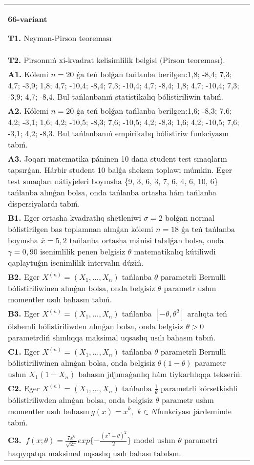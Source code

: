 \documentclass{article}
\begin{document}
\vspace{1cm}


\begin{tabular}{m{17cm}}
\textbf{66-variant}
\newline

\textbf{T1.} 
Neyman-Pirson teoreması
 \\
\textbf{T2.} 
Pirsonnıń xi-kvadrat kelisimlilik belgisi (Pirson teoreması).
 \\
\textbf{A1.} 
Kólemi \(n = 20\) ǵa teń bolǵan tańlanba berilgen:1,8; -8,4; 7,3; 4,7; -3,9; 1,8; 4,7; -10,4; -8,4; 7,3; -10,4; 4,7; -8,4; 1,8; 4,7; -10,4; 7,3; -3,9; 4,7; -8,4. Bul tańlanbanıń statistikalıq bólistiriliwin tabıń.
 \\
\textbf{A2.} 
Kólemi \(n = 20\) ǵa teń bolǵan tańlanba berilgen:1,6; -8,3; 7,6; 4,2; -3,1; 1,6; 4,2; -10,5; -8,3; 7,6; -10,5; 4,2; -8,3; 1,6; 4,2; -10,5; 7,6; -3,1; 4,2; -8,3. Bul tańlanbanıń empirikalıq bólistiriw funkciyasın tabıń.
 \\
\textbf{A3.} 
Joqarı matematika páninen 10 dana student test sınaqların tapsırǵan. Hárbir student 10 balǵa shekem toplawı múmkin. Eger test sınaqları nátiyjeleri boyınsha \{9, 3, 6, 3, 7, 6, 4, 6, 10, 6\} tańlanba alınǵan bolsa, onda tańlanba ortasha hám tańlanba dispersiyalardı tabıń.
 \\
\textbf{B1.} 
Eger ortasha kvadratlıq shetleniwi \(\sigma = 2\) bolǵan normal bólistirilgen bas toplamnan alınǵan kólemi \(n = 18\) ǵa teń tańlanba boyınsha \(\overline{x} = 5,2\) tańlanba ortasha mánisi tabılǵan bolsa, onda \(\gamma = 0,90\) isenimlilik penen belgisiz \(\theta\) matematikalıq kútiliwdi qaplaytuǵın isenimlilik intervalın dúziń.
 \\
\textbf{B2.} 
Eger \(X^{(n)} = \left( X_{1},...,X_{n} \right)\) tańlanba \(\theta\) parametrli Bernulli bólistiriliwinen alınǵan bolsa, onda belgisiz \(\theta\) parametr ushın momentler usılı bahasın tabıń.
 \\
\textbf{B3.} 
Eger \(X^{(n)} = \left( X_{1},...,X_{n} \right)\) tańlanba \(\left\lbrack - \theta,\theta^{2} \right\rbrack\) aralıqta teń ólshemli bólistiriliwden alınǵan bolsa, onda belgisiz \(\theta > 0\) parametrdiń shınlıqqa maksimal uqsaslıq usılı bahasın tabıń.
 \\
\textbf{C1.} 
Eger \(X^{(n)} = \left( X_{1},...,X_{n} \right)\) tańlanba \(\theta\) parametrli Bernulli bólistiriliwinen alınǵan bolsa, onda belgisiz \(\theta(1 - \theta)\) parametr ushın \(X_{1}\left( 1 - X_{n} \right)\) bahasın jıljımaǵanlıq hám tiykarlılıqqa tekseriń.
 \\
\textbf{C2.} 
Eger \(X^{(n)} = \left( X_{1},...,X_{n} \right)\) tańlanba \(\frac{1}{\theta}\) parametrli kórsetkishli bólistiriliwden alınǵan bolsa, onda belgisiz \(\theta\) parametr ushın momentler usılı bahasın\({\ g(x) = x}^{k},\) \(k \in N\)funkciyası járdeminde tabıń.
 \\
\textbf{C3.} 
\(\ f(x;\theta) = \frac{7x^{6}}{\sqrt{2\pi}}exp\{ - \frac{(x^{7} - \theta)^{2}}{2}\}\) model ushın \(\theta\) parametri haqıyqatqa maksimal uqsaslıq usılı bahası tabılsın.
 \\

\end{tabular}
\vspace{1cm}
\end{document}

